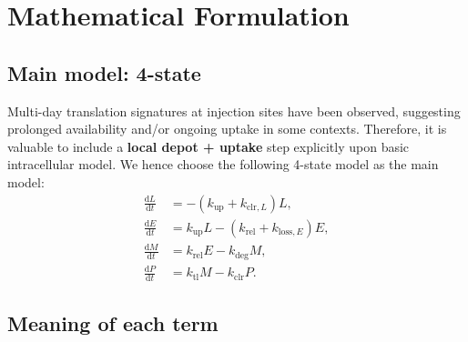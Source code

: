 \section{Mathematical Formulation}
\subsection*{Main model: 4-state}

Multi-day translation signatures at injection sites have been observed, suggesting prolonged availability and/or ongoing uptake in some contexts. \parencite{pardi2015expressionKinetics} Therefore, it is valuable to include a \textbf{local depot + uptake} step explicitly upon basic intracellular model. We hence choose the following 4-state model as the main model:
\begin{align}
\frac{\mathrm{d}L}{\mathrm{d}t} &= -(k_{\mathrm{up}} + k_{\mathrm{clr},L})L, \\
\frac{\mathrm{d}E}{\mathrm{d}t} &= k_{\mathrm{up}}L - (k_{\mathrm{rel}} + k_{\mathrm{loss},E})E, \\
\frac{\mathrm{d}M}{\mathrm{d}t} &= k_{\mathrm{rel}}E - k_{\mathrm{deg}}M, \\
\frac{\mathrm{d}P}{\mathrm{d}t} &= k_{\mathrm{tl}}M - k_{\mathrm{clr}}P.
\end{align}

\subsection*{Meaning of each term}

